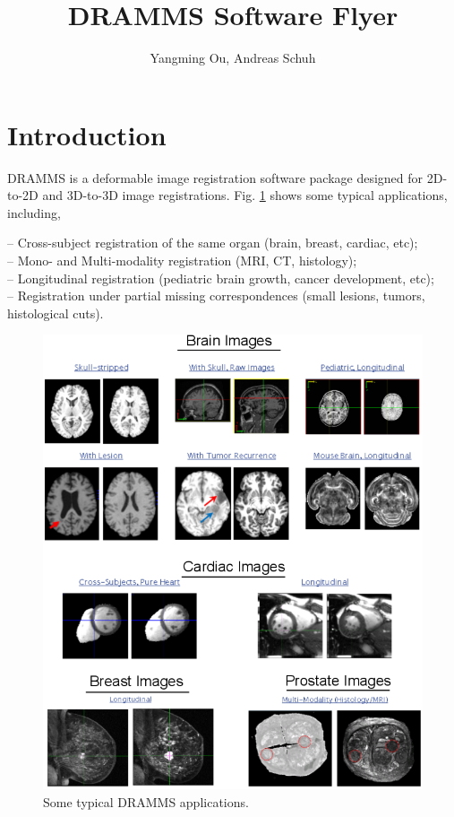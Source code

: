 \documentclass[a4paper,12pt]{article}
\title{DRAMMS Software Flyer}
\author{Yangming Ou, Andreas Schuh}
\begin{document}
\maketitle


\section{Introduction}
\label{intro}

DRAMMS is a deformable image registration software package designed for 2D-to-2D and 3D-to-3D image registrations. Fig. \ref{fig:DRAMMSApplications} shows some typical applications, including, 

\indent -- Cross-subject registration of the same organ (brain, breast, cardiac, etc); \\
\indent -- Mono- and Multi-modality registration (MRI, CT, histology); \\
\indent -- Longitudinal registration (pediatric brain growth, cancer development, etc); \\
\indent -- Registration under partial missing correspondences (small lesions, tumors, histological cuts). \\


\begin{figure}[ht!]
	\centering
	\includegraphics[width=15cm]{AllExamples.png}
	\caption{Some typical DRAMMS applications.}
	\label{fig:DRAMMSApplications}
\end{figure}
\end{document}
